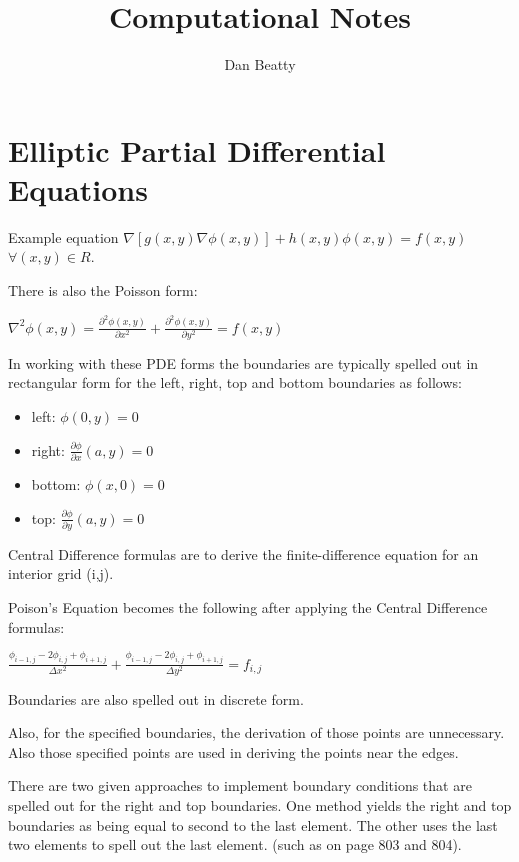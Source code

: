 \documentclass[11pt]{article}
\title{Computational Notes}
\author{Dan Beatty}
\begin{document}
\maketitle

\section{Elliptic Partial Differential Equations}

Example equation $\nabla [ g(x,y)\nabla \phi (x,y)] + h(x,y)\phi (x,y) = f(x,y) $  $\forall (x,y)\in R$. 

There is also the Poisson form: 

$ \nabla ^2 \phi (x,y)  = 
\frac { \partial^2 \phi (x,y) }{ \partial x^2 } 
+ \frac {\partial ^2 \phi (x,y)}{\partial y^2} = f(x,y) $

In working with these PDE forms the boundaries are typically spelled out in rectangular form for the left, right, top and bottom boundaries as follows:
\begin{itemize}
\item left:  $\phi (0,y) = 0 $
\item right: $\frac{\partial \phi}{\partial x} (a,y) = 0$
\item bottom: $\phi (x,0) = 0$
\item top:   $\frac{\partial \phi}{\partial y} (a,y) = 0$
\end{itemize}

Central Difference formulas are to derive the finite-difference equation for an interior grid (i,j). 

Poison's Equation becomes the following after applying the Central Difference formulas:  


$\frac{\phi _{i-1,j} -2 \phi _{i,j} + \phi _{i+1,j} }{\Delta x^2} + \frac{\phi _{i-1,j} -2 \phi _{i,j} + \phi _{i+1,j} }{\Delta y^2} =f_{i,j}$

Boundaries are also spelled out in discrete form.  

Also, for the specified boundaries, the derivation of those points are unnecessary.  Also those specified points are used in deriving the points near the edges.  

There are two given approaches to implement boundary conditions that are spelled out for the right and top boundaries.  One method yields the right and top boundaries as being equal to second to the last element.  The other uses the last two elements to spell out the last element.   (such as on page 803 and 804).  
\end{document}

